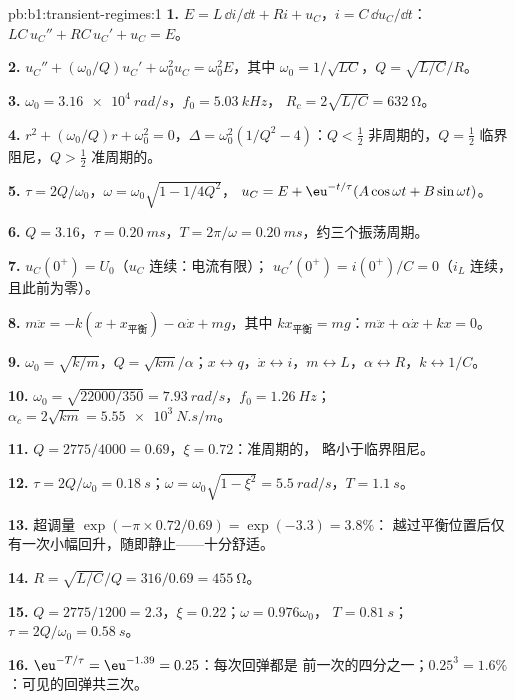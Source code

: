 \begin{solution}{pb:b1:transient-regimes:1}
\textbf{1.} $E = L\,\dd i/\dd t + Ri + u_C$，$i = C\,\dd u_C/\dd t$：
$LC\,u_C'' + RC\,u_C' + u_C = E$。

\textbf{2.} $u_C'' + (\omega_0/Q)u_C' + \omega_0^2u_C = \omega_0^2E$，其中
$\omega_0 = 1/\sqrt{LC}$，$Q = \sqrt{L/C}/R$。

\textbf{3.} $\omega_0 = \qty{3.16e4}{rad/s}$，$f_0 = \qty{5.03}{kHz}$，
$R_c = 2\sqrt{L/C} = \qty{632}{\ohm}$。

\textbf{4.} $r^2 + (\omega_0/Q)r + \omega_0^2 = 0$，$\Delta = \omega_0^2(1/Q^2
- 4)$：$Q < \tfrac12$ 非周期的，$Q = \tfrac12$ 临界阻尼，$Q > \tfrac12$
准周期的。

\textbf{5.} $\tau = 2Q/\omega_0$，$\omega = \omega_0\sqrt{1 - 1/4Q^2}$，
$u_C = E + \eu^{-t/\tau}(A\cos\omega t + B\sin\omega t)$。

\textbf{6.} $Q = 3.16$，$\tau = \qty{0.20}{ms}$，$T = 2\pi/\omega =
\qty{0.20}{ms}$，约三个振荡周期。

\textbf{7.} $u_C(0^+) = U_0$（$u_C$ 连续：电流有限）；
$u_C'(0^+) = i(0^+)/C = 0$（$i_L$ 连续，且此前为零）。

\textbf{8.} $m\ddot x = -k(x + x_{\text{平衡}}) - \alpha\dot x + mg$，其中
$kx_{\text{平衡}} = mg$：$m\ddot x + \alpha\dot x + kx = 0$。

\textbf{9.} $\omega_0 = \sqrt{k/m}$，$Q = \sqrt{km}/\alpha$；$x \leftrightarrow
q$，$\dot x \leftrightarrow i$，$m \leftrightarrow L$，$\alpha \leftrightarrow
R$，$k \leftrightarrow 1/C$。

\textbf{10.} $\omega_0 = \sqrt{22000/350} = \qty{7.93}{rad/s}$，$f_0 =
\qty{1.26}{Hz}$；$\alpha_c = 2\sqrt{km} = \qty{5.55e3}{N.s/m}$。

\textbf{11.} $Q = 2775/4000 = 0.69$，$\xi = 0.72$：准周期的，
略小于临界阻尼。

\textbf{12.} $\tau = 2Q/\omega_0 = \qty{0.18}{s}$；$\omega = \omega_0\sqrt{1
- \xi^2} = \qty{5.5}{rad/s}$，$T = \qty{1.1}{s}$。

\textbf{13.} 超调量 $\exp(-\pi \times 0.72/0.69) = \exp(-3.3) = 3.8\%$：
越过平衡位置后仅有一次小幅回升，随即静止——十分舒适。

\textbf{14.} $R = \sqrt{L/C}/Q = 316/0.69 = \qty{455}{\ohm}$。

\textbf{15.} $Q = 2775/1200 = 2.3$，$\xi = 0.22$；$\omega = 0.976\omega_0$，
$T = \qty{0.81}{s}$；$\tau = 2Q/\omega_0 = \qty{0.58}{s}$。

\textbf{16.} $\eu^{-T/\tau} = \eu^{-1.39} = 0.25$：每次回弹都是
前一次的四分之一；$0.25^3 = 1.6\%$：可见的回弹共三次。


\end{solution}

